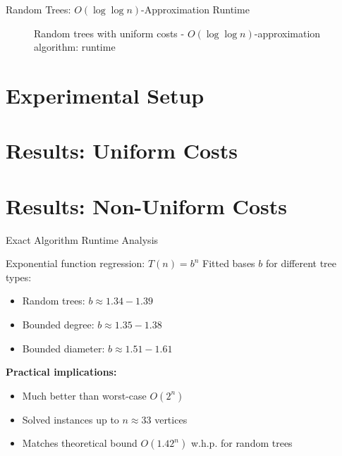 \documentclass[aspectratio=169]{beamer}
\begin{document}
\begin{frame}{Random Trees: $O(\log \log n)$-Approximation Runtime}
\begin{figure}
\centering
{}
\caption{Random trees with uniform costs - $O(\log \log n)$-approximation algorithm: runtime}
\end{figure}
\end{frame}

\section{Experimental Setup}

\section{Results: Uniform Costs}

\section{Results: Non-Uniform Costs}

\begin{frame}{Exact Algorithm Runtime Analysis}
\begin{block}{Exponential function regression: $T(n) = b^n$}
Fitted bases $b$ for different tree types:
\begin{itemize}
    \item Random trees: $b \approx 1.34 - 1.39$
    \item Bounded degree: $b \approx 1.35 - 1.38$ 
    \item Bounded diameter: $b \approx 1.51 - 1.61$
\end{itemize}
\end{block}

\pause

\textbf{Practical implications:}
\begin{itemize}
    \item Much better than worst-case $O(2^n)$
    \item Solved instances up to $n \approx 33$ vertices
    \item Matches theoretical bound $O(1.42^n)$ w.h.p. for random trees
\end{itemize}
\end{frame}
\end{document}
